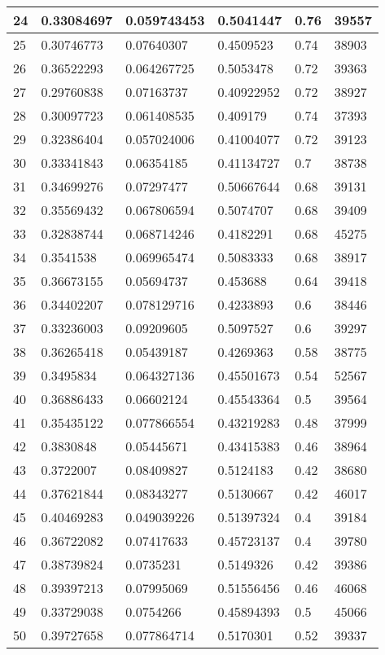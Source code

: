 \begin{longtable}{|l|l|l|l|l|l|}
24 & 0.33084697 & 0.059743453 & 0.5041447 & 0.76 & 39557 \\ \hline 
25 & 0.30746773 & 0.07640307 & 0.4509523 & 0.74 & 38903 \\ \hline 
26 & 0.36522293 & 0.064267725 & 0.5053478 & 0.72 & 39363 \\ \hline 
27 & 0.29760838 & 0.07163737 & 0.40922952 & 0.72 & 38927 \\ \hline 
28 & 0.30097723 & 0.061408535 & 0.409179 & 0.74 & 37393 \\ \hline 
29 & 0.32386404 & 0.057024006 & 0.41004077 & 0.72 & 39123 \\ \hline 
30 & 0.33341843 & 0.06354185 & 0.41134727 & 0.7 & 38738 \\ \hline 
31 & 0.34699276 & 0.07297477 & 0.50667644 & 0.68 & 39131 \\ \hline 
32 & 0.35569432 & 0.067806594 & 0.5074707 & 0.68 & 39409 \\ \hline 
33 & 0.32838744 & 0.068714246 & 0.4182291 & 0.68 & 45275 \\ \hline 
34 & 0.3541538 & 0.069965474 & 0.5083333 & 0.68 & 38917 \\ \hline 
35 & 0.36673155 & 0.05694737 & 0.453688 & 0.64 & 39418 \\ \hline 
36 & 0.34402207 & 0.078129716 & 0.4233893 & 0.6 & 38446 \\ \hline 
37 & 0.33236003 & 0.09209605 & 0.5097527 & 0.6 & 39297 \\ \hline 
38 & 0.36265418 & 0.05439187 & 0.4269363 & 0.58 & 38775 \\ \hline 
39 & 0.3495834 & 0.064327136 & 0.45501673 & 0.54 & 52567 \\ \hline 
40 & 0.36886433 & 0.06602124 & 0.45543364 & 0.5 & 39564 \\ \hline 
41 & 0.35435122 & 0.077866554 & 0.43219283 & 0.48 & 37999 \\ \hline 
42 & 0.3830848 & 0.05445671 & 0.43415383 & 0.46 & 38964 \\ \hline 
43 & 0.3722007 & 0.08409827 & 0.5124183 & 0.42 & 38680 \\ \hline 
44 & 0.37621844 & 0.08343277 & 0.5130667 & 0.42 & 46017 \\ \hline 
45 & 0.40469283 & 0.049039226 & 0.51397324 & 0.4 & 39184 \\ \hline 
46 & 0.36722082 & 0.07417633 & 0.45723137 & 0.4 & 39780 \\ \hline 
47 & 0.38739824 & 0.0735231 & 0.5149326 & 0.42 & 39386 \\ \hline 
48 & 0.39397213 & 0.07995069 & 0.51556456 & 0.46 & 46068 \\ \hline 
49 & 0.33729038 & 0.0754266 & 0.45894393 & 0.5 & 45066 \\ \hline 
50 & 0.39727658 & 0.077864714 & 0.5170301 & 0.52 & 39337 \\ \hline 
\end{longtable}